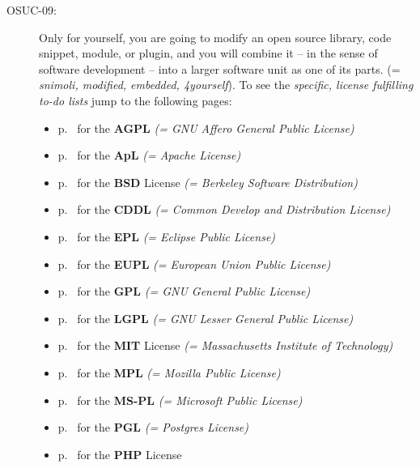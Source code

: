 \begin{description}
\item[OSUC-09:]\label{OSUC-09-DEF} Only for yourself, you are going to modify an
open source library, code snippet, module, or plugin, and you will combine it
-- in the sense of software development -- into a larger software unit as one of
its parts. (= \textit{snimoli, modified, embedded, 4yourself}). 
To see the \textit{specific, license fulfilling to-do lists} jump to the
following pages:
  \begin{itemize}
    \item p.\ \pageref{OSUC-09-AGPL} for the \textbf{AGPL}
      \textit{(= GNU Affero General Public License)} 
    \item p.\ \pageref{OSUC-09-Apache20} for the \textbf{ApL}
      \textit{(= Apache License)}
    \item p.\ \pageref{OSUC-09-BSD} for the \textbf{BSD} License
      \textit{(= Berkeley Software Distribution)}
    \item p.\ \pageref{OSUC-09-CDDL} for the \textbf{CDDL}
      \textit{(= Common Develop and Distribution License)}  
    \item p.\ \pageref{OSUC-09-EPL} for the \textbf{EPL}
      \textit{(= Eclipse Public License)}     
    \item p.\ \pageref{OSUC-09-EUPL} for the \textbf{EUPL}
      \textit{(= European Union Public License)} 
    \item p.\ \pageref{OSUC-09-GPL} for the \textbf{GPL}
       \textit{(= GNU General Public License)} 
    \item p.\ \pageref{OSUC-09-LGPL} for the \textbf{LGPL}
      \textit{(= GNU Lesser General Public License)}           
    \item p.\ \pageref{OSUC-09-MIT} for the \textbf{MIT} License
       \textit{(= Massachusetts Institute of Technology)} 
    \item p.\ \pageref{OSUC-09-MPL} for the \textbf{MPL}
      \textit{(= Mozilla Public License)}     
    \item p.\ \pageref{OSUC-09-MS-PL} for the \textbf{MS-PL}
      \textit{(= Microsoft Public License)} 
    \item p.\ \pageref{OSUC-09-PGL} for the \textbf{PGL}
      \textit{(= Postgres License)} 
    \item p.\ \pageref{OSUC-09-PHP} for the \textbf{PHP} License 
  \end{itemize}



\end{description}
